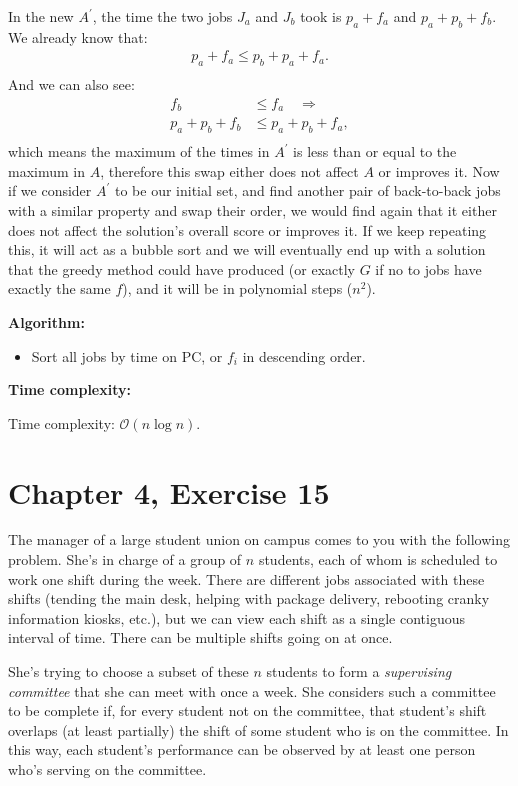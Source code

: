 \documentclass[12pt, letterpaper]{article}
\begin{document}
\noindent In the new $A^{\prime}$, the time the two jobs $J_a$ and $J_b$ took is $p_a + f_a$ and $p_a + p_b + f_b$.
We already know that:
\begin{align*}
    p_a + f_a \leq p_b + p_a + f_a.\\
\end{align*}
And we can also see:
\begin{align*}
    f_b &\leq f_a \quad \Longrightarrow\\
    p_a + p_b + f_b &\leq p_a + p_b + f_a ,\\
\end{align*}
which means the maximum of the times in $A^{\prime}$ is less than or equal to the maximum in $A$, therefore this swap either does not affect $A$ or improves it.
Now if we consider $A^{\prime}$ to be our initial set, and find another pair of back-to-back jobs with a similar property and swap their order, we would find again that it either does not affect the solution's overall score or improves it. If we keep repeating this, it will act as a bubble sort and we will eventually end up with a solution that the greedy method could have produced (or exactly $G$ if no to jobs have exactly the same $f$), and it will be in polynomial steps ($n^2$).

\vspace{7.5mm}
\noindent\textbf{Algorithm:} 
\begin{itemize}
    \item Sort all jobs by time on PC, or $f_i$ in descending order.
\end{itemize}

\vspace{7.5mm}
\noindent\textbf{Time complexity:} 

\noindent Time complexity: $\mathcal{O}(n\log n)$.


\clearpage
\section{Chapter 4, Exercise 15}
The manager of a large student union on campus comes to you with the following problem. 
She's in charge of a group of $n$ students, each of whom is scheduled to work one shift during the week. 
There are different jobs associated with these shifts (tending the main desk, helping with package delivery, rebooting cranky information kiosks, etc.), 
but we can view each shift as a single contiguous interval of time. 
There can be multiple shifts going on at once.

She's trying to choose a subset of these $n$ students to form a \textit{supervising committee} that she can meet with once a week. 
She considers such a committee to be complete if, for every student not on the committee, 
that student's shift overlaps (at least partially) the shift of some student who is on the committee. 
In this way, each student's performance can be observed by at least one person who's serving on the committee.
\end{document}
